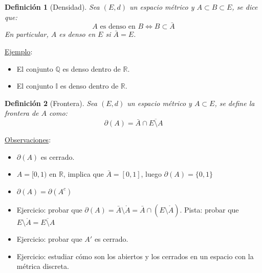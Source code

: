 \documentclass[10pt,a4paper,openright]{book}
\theoremstyle{break}
\newtheorem*{defi}{Definición}
\begin{document}
\begin{defi}[Densidad]
Sea $(E,d)$ un espacio métrico y $A\subset B \subset E$, se dice que:
$$A \mbox{ es denso en }B \Leftrightarrow B\subset \bar{A}$$
En particular, $A$ es denso en $E$ si $\bar{A} = E$.
\end{defi}

\underline{Ejemplo}:
\begin{itemize}
\item El conjunto $\mathbb{Q}$ es denso dentro de $\mathbb{R}$.
\item El conjunto $\mathbb{I}$ es denso dentro de $\mathbb{R}$.
\end{itemize}

\begin{defi}[Frontera]
Sea $(E,d)$ un espacio métrico y $A\subset E$, se define la frontera de $A$ como:
$$\partial(A) = \bar{A}\cap \overline{E\setminus{A}}$$
\end{defi}

\underline{Observaciones}:

\begin{itemize}
\item $\partial(A)$ es cerrado.
\item $A=[0,1)$ en $\mathbb{R}$, implica que $\bar{A} = [0,1]$, luego $\partial(A) = \{0,1\}$
\item $\partial(A) = \partial(A^c)$
\item Ejercicio: probar que $\partial(A)=\bar{A}\setminus{\mathring{A}} = \bar{A}\cap (E\setminus{\mathring{A}})$. Pista: probar que $E\setminus{{\mathring{A}}} = \overline{E\setminus{A}}$
\item Ejercicio: probar que $A'$ es cerrado.
\item Ejercicio: estudiar cómo son los abiertos y los cerrados en un espacio con la métrica discreta.
\end{itemize}
\end{document}
